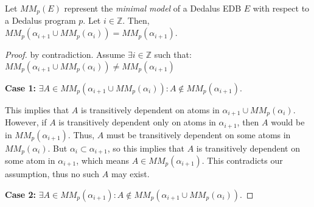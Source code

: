 \begin{lemma} \label{lem:costmodel}
%
Let $MM_p(E)$ represent the {\em minimal model} of a Dedalus EDB $E$ with
respect to a Dedalus program $p$.  Let $i \in \mathbb{Z}$.  Then,
$MM_p(\alpha_{i+1} \cup MM_p(\alpha_i)) = MM_p(\alpha_{i+1})$.
%
\end{lemma}


\begin{proof}



by contradiction. Assume $\exists i \in \mathbb{Z}$ such that:
$MM_p(\alpha_{i+1} \cup MM_p(\alpha_i)) \neq MM_p(\alpha_{i+1})$

{\bf Case 1:} $\exists A \in MM_p(\alpha_{i+1} \cup MM_p(\alpha_i)) : A \not\in MM_p(\alpha_{i+1}).$

This implies that $A$ is transitively dependent on atoms in $\alpha_{i+1} \cup
MM_p(\alpha_i)$.  However, if $A$ is transitively dependent only on atoms in
$\alpha_{i+1}$, then $A$ would be in $MM_p(\alpha_{i+1})$.  Thus, $A$ must be
transitively dependent on some atoms in $MM_p(\alpha_{i})$.  But $\alpha_{i}
\subset \alpha_{i+1}$, so this implies that $A$ is transitively dependent on
some atom in $\alpha_{i+1}$, which means $A \in MM_p(\alpha_{i+1})$.  This
contradicts our assumption, thus no such $A$ may exist.

{\bf Case 2:} $\exists A \in MM_p(\alpha_{i+1}) : A \not\in MM_p(\alpha_{i+1} \cup MM_p(\alpha_i)).$


\end{proof}
